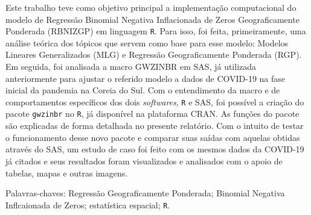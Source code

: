 \documentclass[12pt, a4paper, twoside]{report}
\numberwithin{equation}{section} %
\begin{document}

Este trabalho teve como objetivo principal a implementação computacional do modelo de Regressão Binomial Negativa Inflacionada de Zeros Geograficamente Ponderada (RBNIZGP) em linguagem \texttt{R}. Para isso, foi feita, primeiramente, uma análise teórica dos tópicos que servem como base para esse modelo: Modelos Lineares Generalizados (MLG) e Regressão Geograficamente Ponderada (RGP). Em seguida, foi analisada a macro GWZINBR em SAS, já utilizada anteriormente para ajustar o referido modelo a dados de COVID-19 na fase inicial da pandemia na Coreia do Sul. Com o entendimento da macro e de comportamentos específicos dos dois \textit{softwares}, \texttt{R} e SAS, foi possível a criação do pacote \texttt{gwzinbr} no \texttt{R}, já disponível na plataforma CRAN. As funções do pacote são explicadas de forma detalhada no presente relatório. Com o intuito de testar o funcionamento desse novo pacote e comparar suas saídas com aquelas obtidas através do SAS, um estudo de caso foi feito com os mesmos dados da COVID-19 já citados e seus resultados foram visualizados e analisados com o apoio de tabelas, mapas e outras imagens.

\vspace*{1.5cm}

Palavras-chaves: Regressão Geograficamente Ponderada; Binomial Negativa Inflcaionada de Zeros; estatística espacial; \texttt{R}.

  
\newpage


\end{document}
